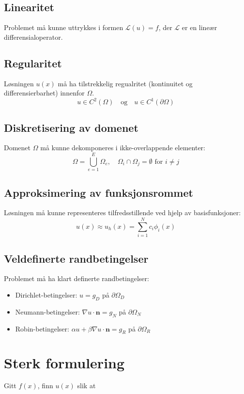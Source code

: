 \subsection{Linearitet} Problemet må kunne uttrykkes i formen \(\mathcal{L}(u) = f\), der \(\mathcal{L}\) er en lineær differensialoperator.

\subsection{Regularitet} Løsningen \( u(x) \) må ha tilstrekkelig regualritet (kontinuitet og differensierbarhet) innenfor \( \Omega \).
\[
    u \in C^2(\Omega) \quad \text{og} \quad u \in C^1(\partial \Omega)
\]

\subsection{Diskretisering av domenet} Domenet \( \Omega \) må kunne dekomponeres i ikke-overlappende elementer:
\[
    \Omega = \bigcup_{e=1}^{E} \Omega_e, \quad \Omega_i \cap \Omega_j = \emptyset \text{ for } i \neq j
\]

\subsection{Approksimering av funksjonsrommet}
Løsningen må kunne representeres tilfredsstillende ved hjelp av basisfunksjoner:
\[
    u(x) \approx u_h(x) = \sum_{i=1}^{N} c_i \phi_i(x)
\]

\subsection{Veldefinerte randbetingelser}
Problemet må ha klart definerte randbetingelser:
\begin{itemize}
    \item Dirichlet-betingelser: \( u = g_D \) på \(\partial \Omega_D \)
    \item Neumann-betingelser: \( \nabla u \cdot \mathbf{n} = g_N \) på \(\partial \Omega_N \)
    \item Robin-betingelser: \( \alpha u + \beta \nabla u \cdot \mathbf{n} = g_R \) på \(\partial \Omega_R \)
\end{itemize}

\section{Sterk formulering}
Gitt $f(x)$, finn $u(x)$ slik at

